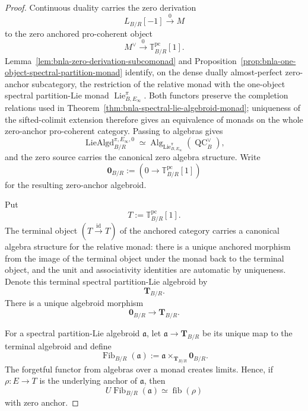 \begin{proof}
Continuous duality carries the zero derivation
\[
    L_{B/R}[-1]\xrightarrow{0}M
\]
to the zero anchored pro-coherent object
\[
    M^\vee\xrightarrow{0}\mathbb T^{\mathrm{pc}}_{B/R}[1].
\]
Lemma~\ref{lem:bnla-zero-derivation-subcomonad} and
Proposition~\ref{prop:bnla-one-object-spectral-partition-monad} identify, on
the dense dually almost-perfect zero-anchor subcategory, the restriction of
the relative monad with the one-object spectral partition-Lie monad
$\operatorname{Lie}^{\pi}_{B,E_\infty}$.  Both functors preserve the
completion relations used in
Theorem~\ref{thm:bnla-spectral-lie-algebroid-monad}; uniqueness of the
sifted-colimit extension therefore gives an equivalence of monads on the whole
zero-anchor pro-coherent category.  Passing to algebras gives
\[
    \operatorname{LieAlgd}^{\pi,E_\infty,0}_{B/R}
    \simeq
    \operatorname{Alg}_{\operatorname{Lie}^{\pi}_{B,E_\infty}}
    (\operatorname{QC}^{\vee}_B),
\]
and the zero source carries the canonical zero algebra structure.  Write
\[
    \mathbf 0_{B/R}
    :=
    \left(0\longrightarrow\mathbb T^{\mathrm{pc}}_{B/R}[1]\right)
\]
for the resulting zero-anchor algebroid.

Put
\[
    T:=\mathbb T^{\mathrm{pc}}_{B/R}[1].
\]
The terminal object $(T\xrightarrow{\operatorname{id}}T)$ of the anchored
category carries a canonical algebra structure for the relative monad: there
is a unique anchored morphism from the image of the terminal object under the
monad back to the terminal object, and the unit and associativity identities
are automatic by uniqueness.  Denote this terminal spectral partition-Lie
algebroid by
\[
    \mathbf T_{B/R}.
\]
There is a unique algebroid morphism
\[
    \mathbf 0_{B/R}\longrightarrow\mathbf T_{B/R}.
\]

For a spectral partition-Lie algebroid $\mathfrak a$, let
$\mathfrak a\to\mathbf T_{B/R}$ be its unique map to the terminal algebroid and
define
\[
\boxed{
    \operatorname{Fib}_{B/R}(\mathfrak a)
    :=
    \mathfrak a
    \times_{\mathbf T_{B/R}}
    \mathbf 0_{B/R}.}
\]
The forgetful functor from algebras over a monad creates limits.  Hence, if
$\rho:E\to T$ is the underlying anchor of $\mathfrak a$, then
\[
    U\operatorname{Fib}_{B/R}(\mathfrak a)
    \simeq
    \operatorname{fib}(\rho)
\]
with zero anchor.


\end{proof}
